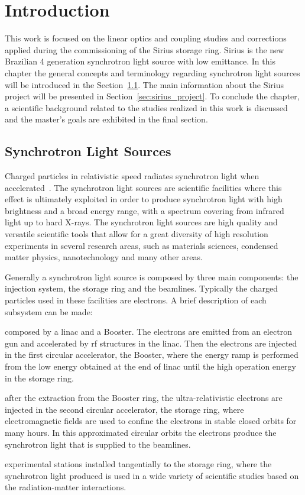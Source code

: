\chapter{Introduction} \label{chap:intro}
This work is focused on the linear optics and coupling studies and corrections applied during the commissioning of the Sirius storage ring. Sirius is the new Brazilian 4 generation synchrotron light source with low emittance. In this chapter the general concepts and terminology regarding synchrotron light sources will be introduced in the Section~\ref{sec:sls}. The main information about the Sirius project will be presented in Section~\ref{sec:sirius_project}. To conclude the chapter, a scientific background related to the studies realized in this work is discussed and the master's goals are exhibited in the final section.
\section{Synchrotron Light Sources}\label{sec:sls}
Charged particles in relativistic speed radiates synchrotron light when accelerated~\cite{jackson}. The synchrotron light sources are scientific facilities where this effect is ultimately exploited in order to produce synchrotron light with high brightness and a broad energy range, with a spectrum covering from infrared light up to hard X-rays. The synchrotron light sources are high quality and versatile scientific tools that allow for a great diversity of high resolution experiments in several research areas, such as materials sciences, condensed matter physics, nanotechnology and many other areas.

Generally a synchrotron light source is composed by three main components: the injection system, the storage ring and the beamlines. Typically the charged particles used in these facilities are electrons. A brief description of each subsystem can be made:
\begin{description}[align=left]
    \item[Injection system:] composed by a \gls{linac} and a Booster. The electrons are emitted from an electron gun and accelerated by \gls{rf} structures in the \gls{linac}. Then the electrons are injected in the first circular accelerator, the Booster, where the energy ramp is performed from the low energy obtained at the end of \gls{linac} until the high operation energy in the storage ring.
    \item[Storage ring:] after the extraction from the Booster ring, the ultra-relativistic electrons are injected in the second circular accelerator, the storage ring, where electromagnetic fields are used to confine the electrons in stable closed orbits for many hours. In this approximated circular orbits the electrons produce the synchrotron light that is supplied to the beamlines.
    \item[Beamlines:] experimental stations installed tangentially to the storage ring, where the synchrotron light produced is used in a wide variety of scientific studies based on the radiation-matter interactions.
\end{description}

